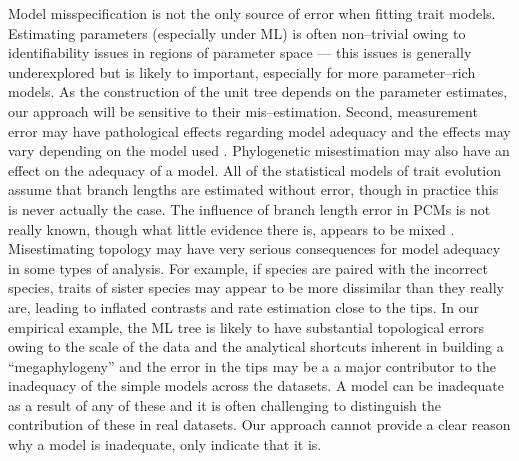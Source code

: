 \documentclass[a4paper,12pt]{article}
\begin{document}
Model misspecification is not the only source of error when fitting trait models. Estimating parameters (especially under ML) is often non--trivial owing to identifiability issues in regions of parameter space \citep{Ane2008, HoAne2012} --- this issues is generally underexplored but is likely to important, especially for more parameter--rich models. As the construction of the unit tree depends on the parameter estimates, our approach will be sensitive to their mis--estimation. Second, measurement error may have pathological effects regarding model adequacy \citep{HarmonLosos2005} and the effects may vary depending on the model used \citep{RevellReynolds2012, PennellPE}. Phylogenetic misestimation may also have an effect on the adequacy of a model. All of the statistical models of trait evolution assume that branch lengths are estimated without error, though in practice this is never actually the case. The influence of branch length error in PCMs is not really known, though what little evidence there is, appears to be mixed \citep{Revell2005, WertheimSanderson2011}. Misestimating topology may have very serious consequences for model adequacy in some types of analysis. For example, if species are paired with the incorrect species, traits of sister species may appear to be more dissimilar than they really are, leading to inflated contrasts and rate estimation close to the tips. In our empirical example, the ML tree is likely to have substantial topological errors owing to the scale of the data and the analytical shortcuts inherent in building a ``megaphylogeny'' \citep{Smith2009, Smith2011} and the error in the tips may be a a major contributor to the inadequacy of the simple models across the datasets. 
A model can be inadequate as a result of any of these and it is often challenging to distinguish the contribution of these in real datasets. Our approach cannot provide a clear reason why a model is inadequate, only indicate that it is.
\end{document}
